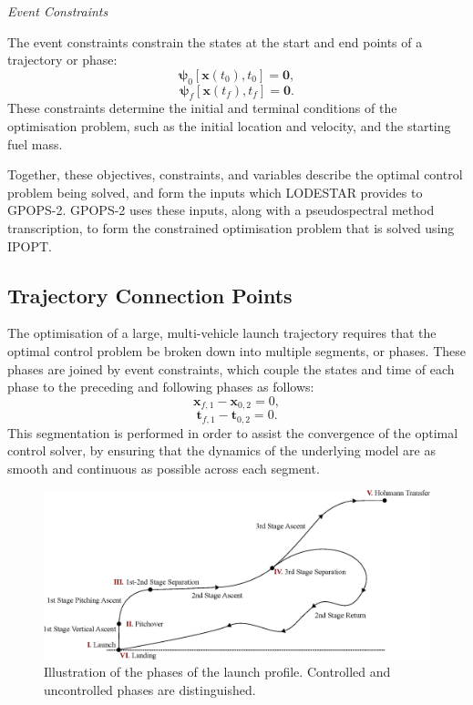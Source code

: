 \noindent \textit{Event Constraints}

\noindent The event constraints constrain the states at the start and end points of a trajectory or phase:
\begin{equation}
\mathbf{\psi}_0[\textbf{x}(t_{0}), t_{0}] = \textbf{0},
\end{equation}
\begin{equation} \label{eq:2}
\mathbf{\psi}_f[\textbf{x}(t_{f}), t_{f}] = \textbf{0}.
\end{equation}
These constraints determine the initial and terminal conditions of the optimisation problem, such as the initial location and velocity, and the starting fuel mass.


Together, these objectives, constraints, and variables describe the optimal control problem being solved, and form the inputs which LODESTAR provides to GPOPS-2. GPOPS-2 uses these inputs, along with a pseudospectral method transcription, to form the constrained optimisation problem that is solved using IPOPT.









\subsection{Trajectory Connection Points}
The optimisation of a large, multi-vehicle launch trajectory requires that the optimal control problem be broken down into multiple segments, or phases\cite{Patterson2015}.
 These phases are joined by event constraints, which couple the states and time of each phase to the preceding and following phases as follows:
 \begin{equation}\label{eq:cont1}
 \textbf{x}_{f,1} - \textbf{x}_{0,2} = 0,
 \end{equation}
 \begin{equation}\label{eq:cont2}
 \textbf{t}_{f,1} - \textbf{t}_{0,2} = 0.
 \end{equation}
 This segmentation is performed in order to assist the convergence of the optimal control solver, by ensuring that the dynamics of the underlying model are as smooth and continuous as possible across each segment. 
  \begin{figure}[ht]
  	\centering
  	\includegraphics[width=1.\linewidth]{figures/4_LODESTAR/Traj}
  	\caption{Illustration of the phases of the launch profile. Controlled and uncontrolled phases are distinguished. }
  	\label{fig:Traj}
  \end{figure}
  
